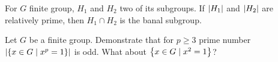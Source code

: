 \begin{exercise}
For \(G\) finite group, \(H_1\) and \(H_2\) two of its subgroups. If \(\left\lvert H_1\right\rvert\) and \(\left\lvert H_2\right\rvert\) are relatively prime, then \(H_1 \cap H_2\) is the banal subgroup.
\end{exercise}

\begin{exercise}
Let \(G\) be a finite group. Demonstrate that for \(p \ge 3\) prime number \( \left\lvert\left\{x \in G \mid x^p = 1\right\}\right\rvert\) is odd. What about \(\left\{x \in G \mid x^2 = 1\right\}\)?
\end{exercise}

